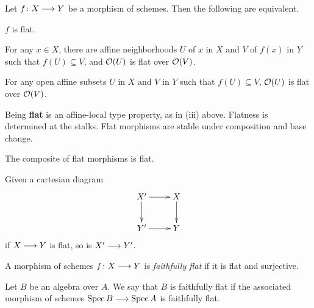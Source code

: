 \begin{1   PRELIMINARY NOTIONS}
\begin{1.1 Algebraic geometry}
\begin{proposition}
Let $f \colon X \arr Y$ be a morphism of schemes. Then the following are equivalent.
\begin{enumeratei}

\item $f$ is flat.

\item For any $x \in X$, there are affine neighborhoods $U$ of $x$ in $X$ and $V$ of $f(x)$ in $Y$ such that $f(U) \subseteq V$, and $\mathcal{O}(U)$ is flat over $\mathcal{O}(V)$.

\item For any open affine subsets $U$ in $X$ and $V$ in $Y$ such that $f(U) \subseteq V$, $\mathcal{O}(U)$ is flat over $\mathcal{O}(V)$.

\end{enumeratei}
\end{proposition}
\begin{shaded}
Being \textbf{flat} is an affine-local type property, as in (iii) above. Flatness is determined at the stalks. Flat morphisms are stable under composition and base change.
\end{shaded}

\begin{proposition}\hfil

\begin{enumeratei}

\item The composite of flat morphisms is flat.

\item Given a cartesian diagram
   \[
   \xymatrix{
   X'\ar[r]\ar[d] & X\ar[d] \\
   Y' \ar[r] & Y
   }
   \]
if $X \arr Y$ is flat, so is $X' \arr Y'$.
\end{enumeratei}
\end{proposition}

\begin{definition}
A morphism of schemes $f \colon X \arr Y$ is \emph{faithfully flat}%
%
 if it is flat and surjective.
\end{definition}

Let $B$ be an algebra over $A$. We say that $B$ is faithfully flat if the associated morphism of schemes $\spec B \arr \spec A$ is faithfully flat.

\begin{proposition}


\end{proposition}
\end{1.1 Algebraic geometry}
\end{1   PRELIMINARY NOTIONS}
